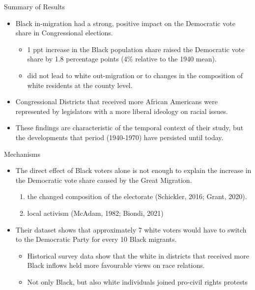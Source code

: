 \documentclass[dvipdfmx,11pt]{beamer}
\begin{document}
\begin{frame}{Summary of Results}
  \begin{itemize}
    \item Black in-migration had a strong, positive impact on the Democratic vote share in Congressional elections.
    \begin{itemize}
      \item 1 ppt increase in the Black population share raised the Democratic vote share by 1.8 percentage points (4\% relative to the 1940 mean).
      \item did not lead to white out-migration or to changes in the composition of white residents at the county level.
    \end{itemize}
    \item Congressional Districts that received more African Americans were represented by legislators with a more liberal ideology on racial issues.
    \item These findings are characteristic of the temporal context of their study, but the developments that period (1940-1970) have persisted until today.
  \end{itemize}
\end{frame}

\begin{frame}{Mechanisms}
  \begin{itemize}
    \item The direct effect of Black voters alone is not enough to explain the increase in the Democratic vote share caused by the Great Migration.
    \begin{enumerate}
      \item the changed composition of the electorate (Schickler, 2016; Grant, 2020).
      \item local activism (McAdam, 1982; Biondi, 2021)
    \end{enumerate}
    \item Their dataset shows that approximately 7 white voters would have to switch to the Democratic Party for every 10 Black migrants.
    \begin{itemize}
      \item Historical survey data show that the white in districts that received more Black inflows held more favourable views on race relations.
      \item Not only Black, but also white individuals joined pro-civil rights protests
    \end{itemize}
  \end{itemize}
\end{frame}
\end{document}
